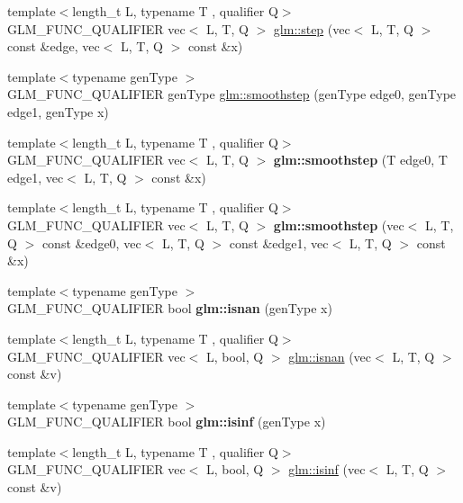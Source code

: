 \begin{DoxyCompactItemize}
\item 
{\footnotesize template$<$length\+\_\+t L, typename T , qualifier Q$>$ }\\G\+L\+M\+\_\+\+F\+U\+N\+C\+\_\+\+Q\+U\+A\+L\+I\+F\+I\+ER vec$<$ L, T, Q $>$ \hyperlink{group__core__func__common_gaf4a5fc81619c7d3e8b22f53d4a098c7f}{glm\+::step} (vec$<$ L, T, Q $>$ const \&edge, vec$<$ L, T, Q $>$ const \&x)
\item 
{\footnotesize template$<$typename gen\+Type $>$ }\\G\+L\+M\+\_\+\+F\+U\+N\+C\+\_\+\+Q\+U\+A\+L\+I\+F\+I\+ER gen\+Type \hyperlink{group__core__func__common_ga562edf7eca082cc5b7a0aaf180436daf}{glm\+::smoothstep} (gen\+Type edge0, gen\+Type edge1, gen\+Type x)
\item 
{\footnotesize template$<$length\+\_\+t L, typename T , qualifier Q$>$ }\\G\+L\+M\+\_\+\+F\+U\+N\+C\+\_\+\+Q\+U\+A\+L\+I\+F\+I\+ER vec$<$ L, T, Q $>$ {\bfseries glm\+::smoothstep} (T edge0, T edge1, vec$<$ L, T, Q $>$ const \&x)
\item 
{\footnotesize template$<$length\+\_\+t L, typename T , qualifier Q$>$ }\\G\+L\+M\+\_\+\+F\+U\+N\+C\+\_\+\+Q\+U\+A\+L\+I\+F\+I\+ER vec$<$ L, T, Q $>$ {\bfseries glm\+::smoothstep} (vec$<$ L, T, Q $>$ const \&edge0, vec$<$ L, T, Q $>$ const \&edge1, vec$<$ L, T, Q $>$ const \&x)
\item 
\mbox{\label{func__common_8inl_afd4cba966f582de51d0957ed0abdb244}} 
{\footnotesize template$<$typename gen\+Type $>$ }\\G\+L\+M\+\_\+\+F\+U\+N\+C\+\_\+\+Q\+U\+A\+L\+I\+F\+I\+ER bool {\bfseries glm\+::isnan} (gen\+Type x)
\item 
{\footnotesize template$<$length\+\_\+t L, typename T , qualifier Q$>$ }\\G\+L\+M\+\_\+\+F\+U\+N\+C\+\_\+\+Q\+U\+A\+L\+I\+F\+I\+ER vec$<$ L, bool, Q $>$ \hyperlink{group__core__func__common_ga29ef934c00306490de837b4746b4e14d}{glm\+::isnan} (vec$<$ L, T, Q $>$ const \&v)
\item 
\mbox{\label{func__common_8inl_a2c0ee7d7e149b7ddf60abb7b73845330}} 
{\footnotesize template$<$typename gen\+Type $>$ }\\G\+L\+M\+\_\+\+F\+U\+N\+C\+\_\+\+Q\+U\+A\+L\+I\+F\+I\+ER bool {\bfseries glm\+::isinf} (gen\+Type x)
\item 
{\footnotesize template$<$length\+\_\+t L, typename T , qualifier Q$>$ }\\G\+L\+M\+\_\+\+F\+U\+N\+C\+\_\+\+Q\+U\+A\+L\+I\+F\+I\+ER vec$<$ L, bool, Q $>$ \hyperlink{group__core__func__common_ga2885587c23a106301f20443896365b62}{glm\+::isinf} (vec$<$ L, T, Q $>$ const \&v)

\end{DoxyCompactItemize}
